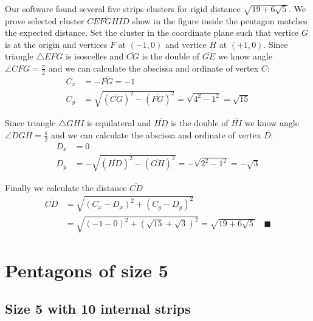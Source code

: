 \documentclass[11pt]{article}
\begin{document}
Our software found several five strips clusters for rigid distance $\sqrt{19+6\sqrt5}$. We prove selected cluster $CEFGHID$ show in the figure inside the pentagon matches the expected distance. Set the cluster in the coordinate plane such that vertice $G$ is at the origin and vertices $F$ at $(-1,0)$ and vertice $H$ at $(+1,0)$.
Since triangle $\triangle{EFG}$ is isoscelles and $\overline{CG}$ is the double of $\overline{GE}$ we know angle $\angle{CFG} = \frac{\pi}2$ and we can calculate the abscissa and ordinate of vertex $C$:
\begin{align}
C_x &= -\overline{FG} = -1 \\
C_y &= \sqrt{(\overline{CG})^2 - (\overline{FG})^2} = \sqrt{4^2 - 1^2} = \sqrt{15}
\end{align}

Since triangle $\triangle{GHI}$ is equilateral and $\overline{HD}$ is the double of $\overline{HI}$ we know angle $\angle{DGH} = \frac{\pi}2$ and we can calculate the abscissa and ordinate of vertex $D$:
\begin{align}
D_x &= 0 \\
D_y &= -\sqrt{(\overline{HD})^2 - (\overline{GH})^2} = -\sqrt{2^2 - 1^2} = -\sqrt3
\end{align}

Finally we calculate the distance $\overline{CD}$
\begin{align}
\overline{CD} &= \sqrt{(C_x - D_x)^2 + (C_y - D_y)^2} \nonumber\\
 &= \sqrt{(-1 - 0)^2 + (\sqrt{15} + \sqrt{3})^2} = \sqrt{19 + 6\sqrt5} \quad\blacksquare
\end{align}


\section{Pentagons of size 5}

\subsection{Size 5 with 10 internal strips}
\end{document}
